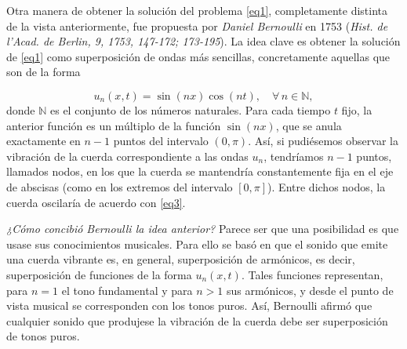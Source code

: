 Otra manera de obtener la solución del problema \ref{eq1}, completamente distinta de la vista anteriormente, fue propuesta por \textit{Daniel Bernoulli} en 1753 (\textit{Hist. de l'Acad. de Berlin, 9, 1753, 147-172; 173-195}). La idea clave es obtener la solución de \ref{eq1} como superposición de ondas más sencillas, concretamente aquellas que son de la forma

\begin{equation}\label{eq3}
	u_n(x,t) = \sin(nx) \cos(nt), \quad \forall \, n \in \mathbb{N},
\end{equation}
\newline
donde $\mathbb{N}$ es el conjunto de los números naturales. Para cada tiempo $t$ fijo, la anterior función es un múltiplo de la función $\sin(nx)$, que se anula exactamente en $n-1$ puntos del intervalo $(0, \pi)$. Así, si pudiésemos observar la vibración de la cuerda correspondiente a las ondas \( u_n \), tendríamos \( n - 1 \) puntos, llamados
nodos, en los que la cuerda se mantendría constantemente fija en el eje de
abscisas (como en los extremos del intervalo \([0, \pi]\)). Entre dichos nodos, la
cuerda oscilaría de acuerdo con \ref{eq3}.

\textit{¿Cómo concibió Bernoulli la idea anterior?} Parece ser que una posibilidad es
que usase sus conocimientos musicales. Para ello se basó en que el sonido que
emite una cuerda vibrante es, en general, superposición de armónicos, es decir,
superposición de funciones de la forma \( u_n(x, t) \). Tales funciones representan,
para \( n = 1 \) el tono fundamental y para \( n > 1 \) sus armónicos, y desde el
punto de vista musical se corresponden con los tonos puros. Así, Bernoulli
afirmó que cualquier sonido que produjese la vibración de la cuerda debe ser
superposición de tonos puros. 


